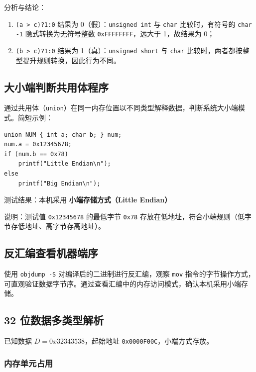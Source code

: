 \documentclass[12pt, a4paper]{academics}
\begin{document}
分析与结论：

\begin{enumerate}
    \item \texttt{(a > c)?1:0} 结果为 0（假）：\texttt{unsigned int} 与 \texttt{char} 比较时，有符号的 \texttt{char -1} 隐式转换为无符号整数 \texttt{0xFFFFFFFF}，远大于 1，故结果为 0；
    \item \texttt{(b > c)?1:0} 结果为 1（真）：\texttt{unsigned short} 与 \texttt{char} 比较时，两者都按整型提升规则转换，因此行为不同。
\end{enumerate}

\subsection{大小端判断共用体程序}

通过共用体（\texttt{union}）在同一内存位置以不同类型解释数据，判断系统大小端模式。简短示例：

\begin{verbatim}
union NUM { int a; char b; } num;
num.a = 0x12345678;
if (num.b == 0x78)
    printf("Little Endian\n");
else
    printf("Big Endian\n");
\end{verbatim}

测试结果：本机采用 \textbf{小端存储方式（Little Endian）}

说明：测试值 \texttt{0x12345678} 的最低字节 \texttt{0x78} 存放在低地址，符合小端规则（低字节存低地址、高字节存高地址）。

\subsection{反汇编查看机器端序}

使用 \texttt{objdump -S} 对编译后的二进制进行反汇编，观察 \texttt{mov} 指令的字节操作方式，可直观验证数据字节序。通过查看汇编中的内存访问模式，确认本机采用小端存储。

\subsection{32 位数据多类型解析}

已知数据 \(D = 0x32343538\)，起始地址 \texttt{0x0000F00C}，小端方式存放。

\subsubsection{内存单元占用}
\end{document}
